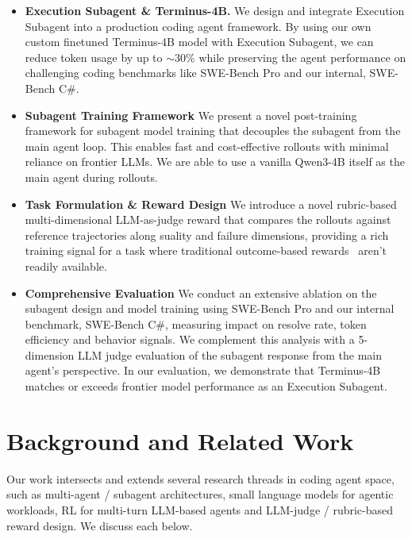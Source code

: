 \documentclass[sigconf,review]{acmart}
\begin{document}
\begin{itemize}
    \item \textbf{Execution Subagent \& Terminus-4B.} We design and integrate Execution Subagent into a production coding agent framework. By using our own custom finetuned Terminus-4B model with Execution Subagent, we can reduce token usage by up to $\sim$30\% while preserving the agent performance on challenging coding benchmarks like SWE-Bench Pro and our internal, SWE-Bench C\#.
    \item \textbf{Subagent Training Framework} We present a novel post-training framework for subagent model training that decouples the subagent from the main agent loop. This enables fast and cost-effective rollouts with minimal reliance on frontier LLMs. We are able to use a vanilla Qwen3-4B itself as the main agent during rollouts.
    \item \textbf{Task Formulation \& Reward Design} We introduce a novel rubric-based multi-dimensional LLM-as-judge reward that compares the rollouts against reference trajectories along suality and failure dimensions, providing a rich training signal for a task where traditional outcome-based rewards~\cite{instructgpt} aren't readily available.
    \item \textbf{Comprehensive Evaluation} We conduct an extensive ablation on the subagent design and model training using SWE-Bench Pro and our internal benchmark, SWE-Bench C\#, measuring impact on resolve rate, token efficiency and behavior signals. We complement this analysis with a 5-dimension LLM judge evaluation of the subagent response from the main agent's perspective. In our evaluation, we demonstrate that Terminus-4B matches or exceeds frontier model performance as an Execution Subagent.
\end{itemize}

\section{Background and Related Work} 
Our work intersects and extends several research threads in coding agent space, such as multi-agent / subagent architectures, small language models for agentic workloads, RL for multi-turn LLM-based agents and LLM-judge / rubric-based reward design. We discuss each below.
\end{document}

